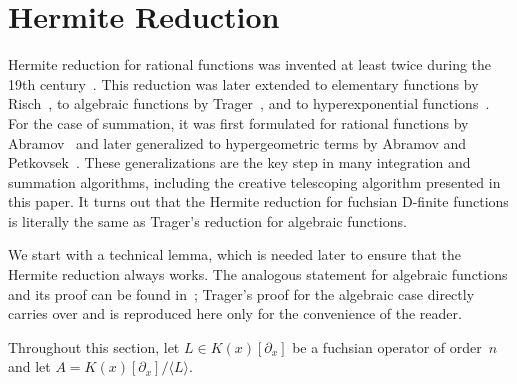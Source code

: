 \documentclass[final,1p,times,authoryear]{elsarticle}
\def\<#1>{\langle#1\rangle}
\begin{document}
\section{Hermite Reduction}\label{sec:hermite}

Hermite reduction for rational functions was invented at least twice during the 19th century~\citep{Ostrogradsky1845,Hermite1872}.
This reduction was later extended
to elementary functions by Risch~\citep{Risch1969,Risch1970,ACA1992,bronstein98,BronsteinBook},
to algebraic functions by Trager~\citep{trager84,ACA1992,bronstein98}, and
to hyperexponential functions~\citep{bostan13a}.
For the case of summation, it was first formulated for rational functions by Abramov~\cite{Abramov1975}
and later generalized to hypergeometric terms by Abramov and Petkovsek~\cite{AbramovPetkovsek2002a,AbramovPetkovsek2002b}.
These generalizations are the key step in many integration and summation algorithms, including the
creative telescoping algorithm presented in this paper.
It turns out that the Hermite reduction for fuchsian D-finite functions
is literally the same as Trager's reduction for algebraic functions.

We start with a technical lemma, which is needed later to ensure that the
Hermite reduction always works. The analogous statement for algebraic
functions and its proof can be found in~\citep[pp. 46--47]{trager84}; Trager's
proof for the algebraic case directly carries over and is reproduced here
only for the convenience of the reader.

Throughout this section, let $L\in K(x)[\partial_x]$ be a fuchsian operator
of order~$n$ and let $A=K(x)[\partial_x]/\<L>$.
\end{document}
